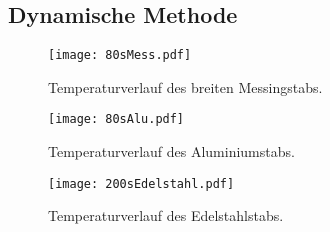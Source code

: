 \subsection{Dynamische Methode}
\label{dynam}

\begin{figure}
  \centering
  \texttt{[image: 80sMess.pdf]}
  \caption{Temperaturverlauf des breiten Messingstabs.}
  \label{fig:80sMess}
\end{figure}

\begin{figure}
  \centering
  \texttt{[image: 80sAlu.pdf]}
  \caption{Temperaturverlauf des Aluminiumstabs.}
  \label{fig:80sAlu}
\end{figure}

\begin{figure}
  \centering
  \texttt{[image: 200sEdelstahl.pdf]}
  \caption{Temperaturverlauf des Edelstahlstabs.}
  \label{fig:200sEdelstahl}
\end{figure}
